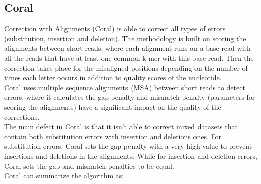 \documentclass[12pt,openany]{llncs}
\begin{document}
\subsection{Coral}
Correction with Alignments (Coral) \cite{Coral} is able to correct all types of errors (substitution, insertion and deletion). The methodology is built on scoring the alignments between short reads, where each alignment runs on a base read with all the reads that have at least one common k-mer with this base read. Then the correction takes place for the misaligned positions depending on the number of times each letter occurs in addition to quality scores of the nucleotide.
\\
Coral uses multiple sequence alignments (MSA) \cite{coral-alignment} between short reads to detect errors, where it calculates the gap penalty and mismatch penalty (parameters for scoring the alignments) have a significant impact on the quality of the corrections. 
\\
The main defect in Coral is that it isn't able to correct mixed datasets that contain both substitution errors with insertion and deletions ones.
For substitution errors, Coral sets the gap penalty with a very high value to prevent insertions and deletions in the alignments. While for insertion and deletion errors, Coral sets the gap and mismatch penalties to be equal.
\\
Coral can summarize the algorithm as:
\end{document}
